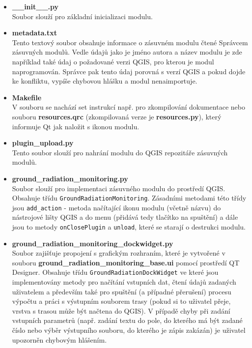 \begin{itemize} %
	\item \textbf{\_\_init\_\_.py} \\ 
		Soubor slouží pro základní inicializaci modulu.
		 
	\item \textbf{metadata.txt} \\
		Tento textový soubor obsahuje informace o zásuvném modulu čtené Správcem zásuvných modulů. Vedle údajů jako je jméno autora a název modulu je zde například také údaj o požadované verzi QGIS, pro kterou je modul naprogramován. Správce pak tento údaj porovná s verzí QGIS a pokud dojde ke konfliktu, vypíše chybovou hlášku a modul nenaimportuje.
	
	\item \textbf{Makefile} \\
		V souboru se nachází set instrukcí např. pro zkompilování dokumentace nebo souboru \textbf{resources.qrc} (zkompilovaná verze je \textbf{resources.py}), který informuje Qt jak naložit s ikonou modulu.
		
	\item \textbf{plugin\_upload.py} \\
		Tento soubor slouží pro nahrání modulu do QGIS repozitáře zásuvných modulů.

	\item \textbf{ground\_radiation\_monitoring.py} \\
		Soubor slouží pro implementaci zásuvného modulu do prostředí QGIS. Obsahuje třídu \texttt{GroundRadiationMonitoring}. Zásadními metodami této třídy jsou \texttt{add\_action} - metoda načítající ikonu modulu (včetně názvu) do nástrojové lišty QGIS a do menu (přidává tedy tlačítko na spuštění) a dále jsou to metody \texttt{onClosePlugin} a \texttt{unload}, které se starají o destrukci modulu.

	\item \textbf{ground\_radiation\_monitoring\_dockwidget.py} \\
		Soubor zajišťuje propojení s grafickým rozhraním, které je vytvořené v souboru \textbf{ground\_radiation\_monitoring\_base.ui} pomocí prostředí QT Designer. Obsahuje třídu \texttt{GroundRadiationDockWidget} ve které jsou implementovány metody pro načítání vstupních dat, čtení údajů zadaných uživatelem a především také pro spuštění (a případné přerušení) procesu výpočtu a práci s výstupním souborem trasy (pokud si to uživatel přeje, vrstva s trasou může být načtena do QGIS). V případě chyby při zadání vstupních parametrů (např. zadání textu do pole, do kterého má být zadané číslo nebo výběr výstupního souboru, do kterého je zápis zakázán) je uživatel upozorněn chybovým hlášením.     
	

\end{itemize}
